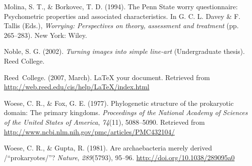 \documentclass[12pt,twoside]{reedthesis}
\begin{document}
  \hypertarget{ref-Molina1994}{}
  Molina, S. T., \& Borkovec, T. D. (1994). The Penn State worry
  questionnaire: Psychometric properties and associated characteristics.
  In G. C. L. Davey \& F. Tallis (Eds.), \emph{Worrying: Perspectives on
  theory, assessment and treatment} (pp. 265--283). New York: Wiley.
  
  \hypertarget{ref-noble2002}{}
  Noble, S. G. (2002). \emph{Turning images into simple line-art}
  (Undergraduate thesis). Reed College.
  
  \hypertarget{ref-reedweb2007}{}
  Reed~College. (2007, March). LaTeX your document. Retrieved from
  \url{http://web.reed.edu/cis/help/LaTeX/index.html}
  
  \hypertarget{ref-woeseux5fphylogeneticux5f1977}{}
  Woese, C. R., \& Fox, G. E. (1977). Phylogenetic structure of the
  prokaryotic domain: The primary kingdoms. \emph{Proceedings of the
  National Academy of Sciences of the United States of America},
  \emph{74}(11), 5088--5090. Retrieved from
  \url{http://www.ncbi.nlm.nih.gov/pmc/articles/PMC432104/}
  
  \hypertarget{ref-woeseux5fareux5f1981}{}
  Woese, C. R., \& Gupta, R. (1981). Are archaebacteria merely derived
  /``prokaryotes/''? \emph{Nature}, \emph{289}(5793), 95--96.
  \url{http://doi.org/10.1038/289095a0}


\end{document}
